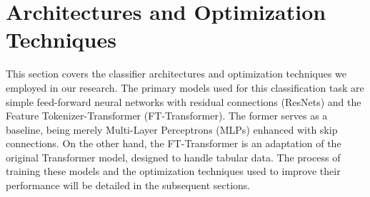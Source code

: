 \section{Architectures and Optimization Techniques}

This section covers the classifier architectures and optimization techniques we employed in our research. The primary
models used for this classification task are simple feed-forward neural networks with residual connections (ResNets) and
the Feature Tokenizer-Transformer (FT-Transformer). The former serves as a baseline, being merely Multi-Layer
Perceptrons (MLPs) enhanced with skip connections. On the other hand, the FT-Transformer is an adaptation of the
original Transformer model, designed to handle tabular data. The process of training these models and the optimization
techniques used to improve their performance will be detailed in the subsequent sections.










